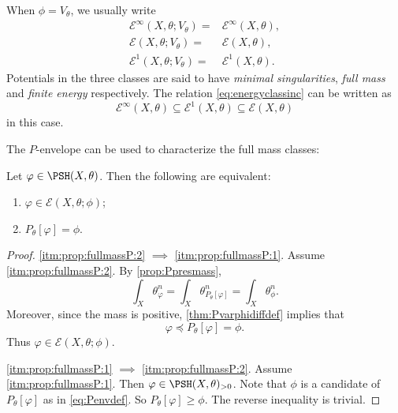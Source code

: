 When $\phi=V_{\theta}$, we usually write
\[
    \begin{aligned}
        \mathcal{E}^{\infty}(X,\theta;V_{\theta})=& \mathcal{E}^{\infty}(X,\theta),\\
        \mathcal{E}(X,\theta;V_{\theta})=& \mathcal{E}(X,\theta),\\
        \mathcal{E}^{1}(X,\theta;V_{\theta})=& \mathcal{E}^{1}(X,\theta).
    \end{aligned}
\]
Potentials in the three classes are said to have \emph{minimal singularities}, \emph{full mass} and \emph{finite energy} respectively. The relation \eqref{eq:energyclassinc} can be written as
\[
\mathcal{E}^{\infty}(X,\theta)\subseteq \mathcal{E}^{1}(X,\theta) \subseteq \mathcal{E}(X,\theta)
\]
in this case.

The $P$-envelope can be used to characterize the full mass classes:
\begin{proposition}\label{prop:fullmassP}
    Let $\varphi\in \PSH(X,\theta)$. Then the following are equivalent:
    \begin{enumerate}
        \item\label{itm:prop:fullmassP:1} $\varphi\in \mathcal{E}(X,\theta;\phi)$;
        \item\label{itm:prop:fullmassP:2} $P_{\theta}[\varphi]=\phi$.
    \end{enumerate}
\end{proposition}
\begin{proof}
    \ref{itm:prop:fullmassP:2} $\implies$ \ref{itm:prop:fullmassP:1}. Assume \ref{itm:prop:fullmassP:2}. By \cref{prop:Ppresmass},
    \[
    \int_X\theta_\varphi^n=\int_X\theta_{P_\theta[\varphi]}^n=\int_X\theta_\phi^n.
    \]
    Moreover, since the mass is positive, \cref{thm:Pvarphidiffdef} implies that
    \[
        \varphi\preceq P_\theta[\varphi]=\phi.
    \]
    Thus $\varphi\in\mathcal E(X,\theta;\phi)$.

    \ref{itm:prop:fullmassP:1} $\implies$ \ref{itm:prop:fullmassP:2}. Assume \ref{itm:prop:fullmassP:1}. Then $\varphi\in \PSH(X,\theta)_{>0}$.
    Note that $\phi$ is a candidate of $P_{\theta}[\varphi]$ as in \eqref{eq:Penvdef}. So $P_{\theta}[\varphi]\geq \phi$. The reverse inequality is trivial.
\end{proof}

